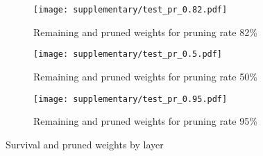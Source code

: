 \begin{figure}[htpb]
    \begin{subfigure}{\textwidth}
    \texttt{[image: supplementary/test\_pr\_0.82.pdf]}
    \caption{Remaining and pruned weights for pruning rate 82\%}
    \label{subfig:pr_0.82}
    \end{subfigure}
    \hfill
    \begin{subfigure}{\textwidth}
    \texttt{[image: supplementary/test\_pr\_0.5.pdf]}
    \label{subfig:pr_0.5}
    \caption{Remaining and pruned weights for pruning rate 50\%}
    \end{subfigure}
    \hfill
    \begin{subfigure}{\textwidth}
    \texttt{[image: supplementary/test\_pr\_0.95.pdf]}
    \caption{Remaining and pruned weights for pruning rate 95\%}
    \label{subfig:pr_0.95}
    \end{subfigure}
    \hfill
    \caption{Survival and pruned weights by layer}
\end{figure}
